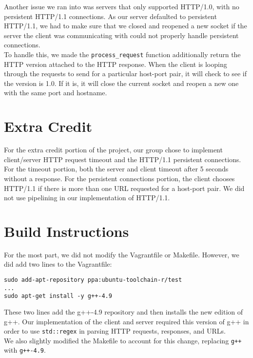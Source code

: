 \documentclass{article}
\begin{document}
Another issue we ran into was servers that only supported HTTP/1.0, with no persistent HTTP/1.1 connections. As our server defaulted to persistent HTTP/1.1, we had to make sure that we closed and reopened a new socket if the server the client was communicating with could not properly handle persistent connections. \\

\noindent
To handle this, we made the \texttt{process\_request} function additionally return the HTTP version attached to the HTTP response. When the client is looping through the requests to send for a particular host-port pair, it will check to see if the version is 1.0. If it is, it will close the current socket and reopen a new one with the same port and hostname.

\section{Extra Credit}

For the extra credit portion of the project, our group chose to implement client/server HTTP request timeout and the HTTP/1.1 persistent connections. For the timeout portion, both the server and client timeout after 5 seconds without a response. For the persistent connections portion, the client chooses HTTP/1.1 if there is more than one URL requested for a host-port pair. We did not use pipelining in our implementation of HTTP/1.1.

\section{Build Instructions}

For the most part, we did not modify the Vagrantfile or Makefile. However, we did add two lines to the Vagrantfile:

\begin{lstlisting}
sudo add-apt-repository ppa:ubuntu-toolchain-r/test
...
sudo apt-get install -y g++-4.9
\end{lstlisting}

\noindent
These two lines add the g++-4.9 repository and then installs the new edition of g++. Our implementation of the client and server required this version of g++ in order to use \texttt{std::regex} in parsing HTTP requests, responses, and URLs. \\

\noindent
We also slightly modified the Makefile to account for this change, replacing \texttt{g++} with \texttt{g++-4.9}.
\end{document}
